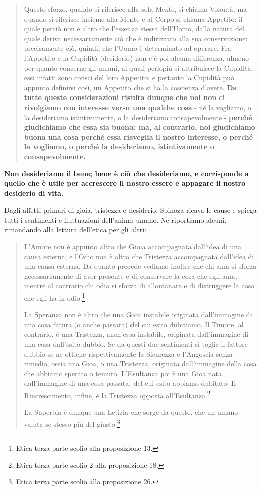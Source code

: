\begin{quotation}
	\small Questo sforzo, quando si riferisce alla sola Mente, si chiama Volontà; ma
	quando si riferisce insieme alla Mente e al Corpo si chiama Appetito: il quale perciò non è
	altro che l’essenza stessa dell’Uomo, dalla natura del quale deriva necessariamente ciò che
	è indirizzato alla sua conservazione: precisamente ciò, quindi, che l’Uomo è determinato
	ad operare. Fra l’Appetito e la Cupidità (desiderio) non c’è poi alcuna differenza, almeno per quanto
	concerne gli umani, ai quali perlopiù si attribuisce la Cupidità: essi infatti sono consci del loro Appetito; e pertanto la Cupidità può appunto definirsi così, un Appetito che si ha la
	coscienza d’avere. \textbf{Da tutte queste considerazioni risulta dunque che noi non ci rivolgiamo
		con interesse verso una qualche cosa} - né la vogliamo, o la desideriamo istintivamente, o la
	desideriamo consapevolmente - \textbf{perché giudichiamo che essa sia buona; ma, al contrario,
		noi giudichiamo buona una cosa perché essa risveglia il nostro interesse, o perché la vogliamo, o perché la desideriamo, istintivamente o consapevolmente.}
\end{quotation}

\textbf{Non desideriamo il bene; bene è ciò che desideriamo, e corrisponde a quello che è utile per accrescere il nostro essere e appagare il nostro desiderio di vita.}

Dagli affetti primari di gioia, tristezza e desiderio, Spinoza ricava le cause e spiega tutti i sentimenti e fluttuazioni dell'animo umano. Ne riportiamo alcuni, rimandando alla lettura dell'etica per gli altri:

\begin{quotation}
	\small L’Amore non è appunto altro che Gioia accompagnata dall’idea di una causa
	esterna; e l’Odio non è altro che Tristezza accompagnata dall’idea di una causa esterna.
	Da quanto precede vediamo inoltre che chi ama si sforza necessariamente di aver presente
	e di conservare la cosa che egli ama, mentre al contrario chi odia si sforza di allontanare e
	di distruggere la cosa che egli ha in odio.\footnote{Etica terza parte scolio alla proposizione 13.}
	
	La Speranza non è altro che una Gioa instabile originata dall’immagine di una cosa futura (o anche passata) del cui esito dubitiamo. Il Timore, al contrario, è una Tristezza,
	anch’essa instabile, originata dall’immagine di una cosa dall’esito dubbio. Se da questi due
	sentimenti si toglie il fattore dubbio se ne ottiene rispettivamente la Sicurezza e l’Angoscia
	senza rimedio, ossia una Gioa, o una Tristezza, originata dall’immagine della cosa che
	abbiamo sperato o temuto. L'Esultanza poi è una Gioa nata dall’immagine di una cosa passata, del cui esito abbiamo dubitato. Il Rincrescimento, infine, è la Tristezza opposta all'Esultanza.\footnote{Etica terza parte scolio 2 alla proposizione 18.}
	
	La Superbia è dunque una Letizia
	che sorge da questo, che un umano valuta se stesso più del giusto.\footnote{Etica terza parte scolio alla proposizione 26.}
\end{quotation}

